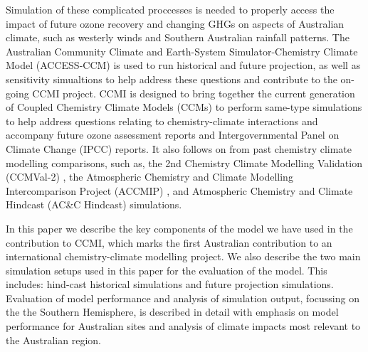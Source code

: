 Simulation of these complicated proccesses is needed to properly access the impact of future ozone recovery and changing GHGs on aspects of Australian climate, such as westerly winds and Southern Australian rainfall patterns. The Australian Community Climate and Earth-System Simulator-Chemistry Climate Model (ACCESS-CCM) is used to run historical and future projection, as well as sensitivity simualtions to help address these questions and contribute to the on-going CCMI project. CCMI is designed to bring together the current generation of Coupled Chemistry Climate Models (CCMs) to perform same-type simulations to help address questions relating to chemistry-climate interactions and accompany future ozone assessment reports and Intergovernmental Panel on Climate Change (IPCC) reports. It also follows on from past chemistry climate modelling comparisons, such as, the 2nd Chemistry Climate Modelling Validation (CCMVal-2) \cite{CCMVal:uf}, the Atmospheric Chemistry and Climate Modelling Intercomparison Project (ACCMIP) \cite{Lamarque:2013jm}, and Atmospheric Chemistry and Climate Hindcast (AC&C Hindcast) simulations. 

In this paper we describe the key components of the model we have used in the contribution to CCMI, which marks the first Australian contribution to an international chemistry-climate modelling project. We also describe the two main simulation setups used in this paper for the evaluation of the model. This includes: hind-cast historical simulations and future projection simulations. Evaluation of model performance and analysis of simulation output, focussing on the the Southern Hemisphere, is described in detail with emphasis on model performance for Australian sites and analysis of climate impacts most relevant to the Australian region.
